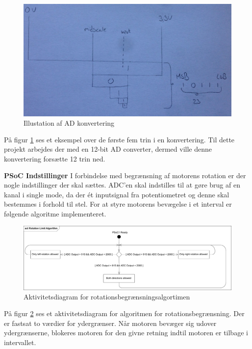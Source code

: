 \begin{figure}[H]
	\centering
	\includegraphics[width=\textwidth]{DesignOgImplementering/images/ADC}
	\caption{Illustation af AD konvertering}
	\label{fig:ADC1}
	
\end{figure}

\noindent På figur \ref{fig:ADC1} ses et eksempel over de første fem trin i en konvertering. Til dette projekt arbejdes der med en 12-bit AD converter, dermed ville denne konvertering forsætte 12 trin ned.  \newline

\noindent \textbf{PSoC Indstillinger} \newline
I forbindelse med begrænsning af motorens rotation er der nogle indstillinger der skal sættes. ADC'en skal indstilles til at gøre brug af en kanal i single mode, da der ét inputsignal fra potentiometret og denne skal bestemmes i forhold til stel. For at styre motorens bevægelse i et interval er følgende algoritme implementeret.

\begin{figure}[H]
	\centering
	\includegraphics[width=\textwidth]{DesignOgImplementering/images/rotationalgorithm}
	\caption{Aktivitetsdiagram for rotationsbegrænsningsalgortimen}
	\label{fig:rotation}
	
\end{figure}

\noindent På figur \ref{fig:rotation} ses et aktivitetsdiagram for algoritmen for rotationsbegrænsning. Der er fastsat to værdier for ydergrænser. Når motoren bevæger sig udover ydergrænserne, blokeres motoren for den givne retning indtil motoren er tilbage i intervallet. 


